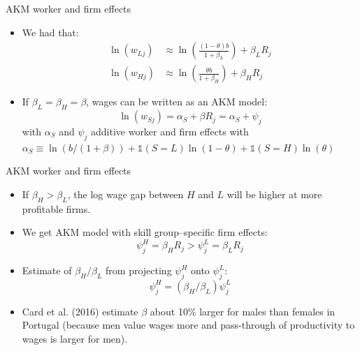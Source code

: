 \documentclass[notes=show]{beamer}
\begin{document}
\begin{frame}{AKM worker and firm effects}
\begin{itemize}
\item We had that:
\begin{align*}
    \ln(w_{Lj}) & \approx \ln \left( \frac{(1-\theta)b}{1 + \beta_{L}} \right) + \beta_{L}R_{j}  \\
    \ln(w_{Hj}) & \approx \ln \left( \frac{\theta b}{1 + \beta_{H}} \right) + \beta_{H}R_{j} 
\end{align*}
\item If $\beta_{L}=\beta_{H}=\beta$, wages can be written as an AKM model:
\begin{equation*}
    \ln(w_{Sj}) = \alpha_{S} + \beta R_{j} = \alpha_{S} + \psi_{j} \tag{15}
\end{equation*}
with $\alpha_{S}$ and $\psi_{j}$ additive worker and firm effects with $ \alpha_{S} \equiv \ln(b/(1+\beta)) + \mathbb{1}(S=L) \ln(1-\theta) + \mathbb{1}(S=H) \ln(\theta)$
\end{itemize}
\end{frame}


\begin{frame}{AKM worker and firm effects}
\begin{itemize}
\item If $\beta_{H} > \beta_{L}$, the log wage gap between $H$ and $L$ will be higher at more profitable firms. \medskip
\item We get AKM model with skill group–specific firm effects:
\begin{equation*}
    \psi_{j}^{H} = \beta_{H}R_{j} > \psi_{j}^{L} = \beta_{L}R_{j} 
\end{equation*}
\item Estimate of $\beta_{H}/ \beta_{L}$ from projecting $\psi_{j}^{H}$ onto $\psi_{j}^{L}$:
\begin{equation*}
    \psi_{j}^{H} = (\beta_{H}/ \beta_{L}) \psi_{j}^{L}
\end{equation*}
\item Card et al. (2016) estimate $\beta$ about 10\% larger for males than females in Portugal (because men value wages more and pass-through of productivity to wages is larger for men).
\end{itemize}
\end{frame}
\end{document}
